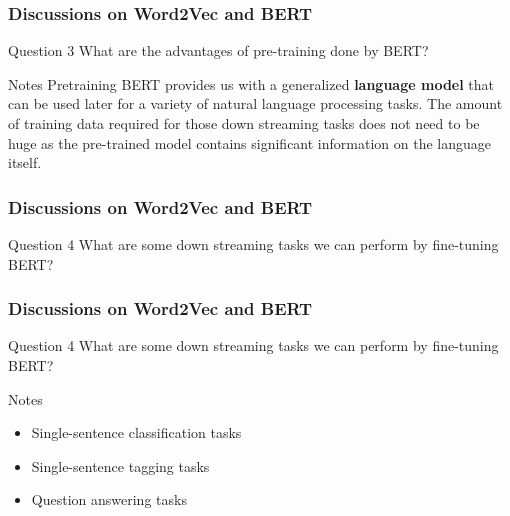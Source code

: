 \documentclass{beamer}
\begin{document}
\begin{frame}
    \frametitle{Discussions on Word2Vec and BERT}
    \begin{block}{Question 3}
        What are the advantages of pre-training done by BERT? 
    \end{block}
    
    \begin{block}{Notes}
        Pretraining BERT provides us with a generalized \textbf{language model} that can be used later for a variety of natural language processing tasks. The amount of training data required for those down streaming tasks does not need to be huge as the pre-trained model contains significant information on the language itself. 
    \end{block}
\end{frame}

\begin{frame}
    \frametitle{Discussions on Word2Vec and BERT}
    \begin{block}{Question 4}
        What are some down streaming tasks we can perform by fine-tuning BERT? 
    \end{block}
\end{frame}

\begin{frame}
    \frametitle{Discussions on Word2Vec and BERT}
    \begin{block}{Question 4}
        What are some down streaming tasks we can perform by fine-tuning BERT? 
    \end{block}
    
    \begin{block}{Notes}
        \begin{itemize}
            \item Single-sentence classification tasks
            \item Single-sentence tagging tasks
            \item Question answering tasks
        \end{itemize}
    \end{block}
\end{frame}

%
\end{document}
